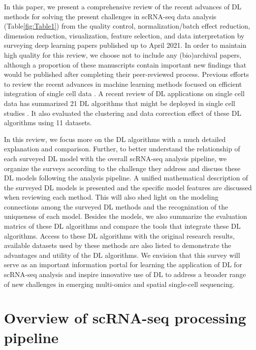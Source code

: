 \documentclass[
]{book}
\begin{document}
In this paper, we present a comprehensive review of the recent advances of DL methods for solving the present challenges in scRNA-seq data analysis (Table\ref{fig:Table1}) from the quality control, normalization/batch effect reduction, dimension reduction, visualization, feature selection, and data interpretation by surveying deep learning papers published up to April 2021. In order to maintain high quality for this review, we choose not to include any (bio)archival papers, although a proportion of these manuscripts contain important new findings that would be published after completing their peer-reviewed process. Previous efforts to review the recent advances in machine learning methods focused on efficient integration of single cell data \citep{RN94, RN90} . A recent review of DL applications on single cell data has summarized 21 DL algorithms that might be deployed in single cell studies \citep{RN80}. It also evaluated the clustering and data correction effect of these DL algorithms using 11 datasets.

In this review, we focus more on the DL algorithms with a much detailed explanation and comparison. Further, to better understand the relationship of each surveyed DL model with the overall scRNA-seq analysis pipeline, we organize the surveys according to the challenge they address and discuss these DL models following the analysis pipeline. A unified mathematical description of the surveyed DL models is presented and the specific model features are discussed when reviewing each method. This will also shed light on the modeling connections among the surveyed DL methods and the recognization of the uniqueness of each model. Besides the models, we also summarize the evaluation matrics of these DL algorithms and compare the tools that integrate these DL algorithms. Access to these DL algorithms with the original research results, available datasets used by these methods are also listed to demonstrate the advantages and utility of the DL algorithms. We envision that this survey will serve as an important information portal for learning the application of DL for scRNA-seq analysis and inspire innovative use of DL to address a broader range of new challenges in emerging multi-omics and spatial single-cell sequencing.

\hypertarget{ch-2}{%
\chapter{Overview of scRNA-seq processing pipeline}\label{ch-2}}
\end{document}
